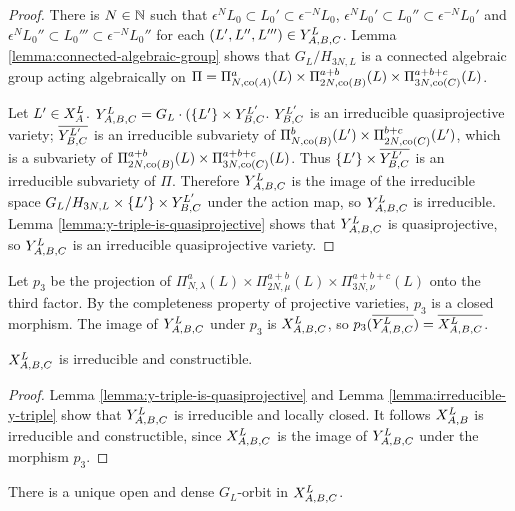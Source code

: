 \documentclass[a4paper, 11pt]{report}
\begin{document}
\begin{proof}{\color{red}
There is $N\in\naturals$ such that $\epsilon^N L_0\subset L_0'\subset\epsilon^{-N}L_0$, $\epsilon^N L_0'\subset L_0''\subset\epsilon^{-N}L_0'$ and $\epsilon^N L_0''\subset L_0'''\subset\epsilon^{-N}L_0''$ for each $(L',L'',L''')\in\yprod[L]{A,B,C}$. Lemma \ref{lemma:connected-algebraic-group} shows that $G_L/{H_{3N,L}}$ is a connected algebraic group acting algebraically on $\Pi = \Pi_{N,\co{A}}^a(L)\times\Pi_{2N,\co{B}}^{a+b}(L)\times\Pi_{3N,\co{C}}^{a+b+c}(L)$.

Let $L'\in\xprod[L]{A}$. $\yprod[L]{A,B,C} = G_L\cdot (\{L'\}\times\yprod[L']{B,C}$. $\yprod[L']{B,C}$ is an irreducible quasiprojective variety; $\overline{\yprod[L']{B,C}}$ is an irreducible subvariety of $\Pi_{N,\co{B}}^b(L')\times\Pi_{2N,\co{C}}^{b+c}(L')$, which is a subvariety of $\Pi_{2N,\co{B}}^{a+b}(L)\times\Pi_{3N,\co{C}}^{a+b+c}(L)$. Thus $\{L'\}\times\overline{\yprod[L']{B,C}}$ is an irreducible subvariety of $\Pi$. Therefore $\yprod[L]{A,B,C}$ is the image of the irreducible space $G_L/{H_{3N,L}}\times\{L'\}\times\yprod[L']{B,C}$ under the action map, so $\yprod[L]{A,B,C}$ is irreducible. Lemma \ref{lemma:y-triple-is-quasiprojective} shows that $\yprod[L]{A,B,C}$ is quasiprojective, so $\yprod[L]{A,B,C}$ is an irreducible quasiprojective variety.}
\end{proof}

Let $p_3$ be the projection of $\Pi_{N,\lambda}^a(L)\times\Pi_{2N,\mu}^{a+b}(L)\times\Pi_{3N,\nu}^{a+b+c}(L)$ onto the third factor. By the completeness property of projective varieties, $p_3$ is a closed morphism. The image of $\yprod[L]{A,B,C}$ under $p_3$ is $\xprod[L]{A,B,C}$, so $p_3(\overline{\yprod[L]{A,B,C}}) = \overline{\xprod[L]{A,B,C}}$.

\begin{lemma}\label{lemma:irreducible-x-triple}
$\xprod[L]{A,B,C}$ is irreducible and constructible.
\end{lemma}

\begin{proof}
Lemma \ref{lemma:y-triple-is-quasiprojective} and Lemma \ref{lemma:irreducible-y-triple} show that $\yprod[L]{A,B,C}$ is irreducible and locally closed. It follows $\xprod[L]{A,B}$ is irreducible and constructible, since $\xprod[L]{A,B,C}$ is the image of $\yprod[L]{A,B,C}$ under the morphism $p_3$.
\end{proof}

\begin{lemma}\label{lemma:generic-triple-product}
There is a unique open and dense $G_L$-orbit in $\xprod[L]{A,B,C}$.
\end{lemma}
\end{document}
